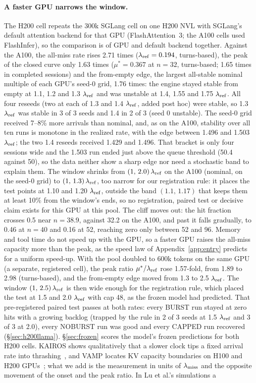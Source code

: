 \paragraph{A faster GPU narrows the window.}\label{sec:h200}
The H200 cell repeats the 300k SGLang cell on one H200 NVL with SGLang's default attention backend for that GPU (FlashAttention~3; the A100 cells used FlashInfer), so the comparison is of GPU and default backend together. Against the A100, the all-miss rate rises 2.71 times ($\lambda_{\mathrm{ref}}=0.194$\sps, turns-based), the peak of the closed curve only 1.63 times ($\mu^*=0.367$\sps{} at $n=32$, turns-based; 1.65 times in completed sessions) and the from-empty edge, the largest all-stable nominal multiple of each GPU's seed-0 grid, 1.76 times: the engine stayed stable from empty at 1.1, 1.2 and 1.3 $\lambda_{\mathrm{ref}}$ and was unstable at 1.4, 1.55 and 1.75 $\lambda_{\mathrm{ref}}$. All four reseeds (two at each of 1.3 and 1.4 $\lambda_{\mathrm{ref}}$, added post hoc) were stable, so 1.3 $\lambda_{\mathrm{ref}}$ was stable in 3 of 3 seeds and 1.4 in 2 of 3 (seed 0 unstable). The seed-0 grid received 7--8\% more arrivals than nominal, and, as on the A100, stability over all ten runs is monotone in the realized rate, with the edge between 1.496 and 1.503 $\lambda_{\mathrm{ref}}$; the two 1.4 reseeds received 1.429 and 1.496. That bracket is only four sessions wide and the 1.503 run ended just above the queue threshold (50.4 against 50), so the data neither show a sharp edge nor need a stochastic band to explain them. The window shrinks from $(1,\,2.0)\,\lambda_{\mathrm{ref}}$ on the A100 (nominal, on the seed-0 grid) to $(1,\,1.3)\,\lambda_{\mathrm{ref}}$, too narrow for our registration rule: it places the test points at 1.10 and 1.20 $\lambda_{\mathrm{ref}}$, outside the band $(1.1,\,1.17)$ that keeps them at least 10\% from the window's ends, so no registration, paired test or decisive claim exists for this GPU at this pool. The cliff moves out: the hit fraction crosses 0.5 near $n=38.9$, against 32.2 on the A100, and past it falls gradually, to 0.46 at $n=40$ and 0.16 at 52, reaching zero only between 52 and 96. Memory and tool time do not speed up with the GPU, so a faster GPU raises the all-miss capacity more than the peak, as the speed law of Appendix~\ref{app:entry} predicts for a uniform speed-up. With the pool doubled to 600k tokens on the same GPU (a separate, registered cell), the peak ratio $\mu^*/\lambda_{\mathrm{ref}}$ rose 1.57-fold, from 1.89 to 2.98 (turns-based), and the from-empty edge moved from 1.3 to 2.5 $\lambda_{\mathrm{ref}}$. The window $(1,\,2.5)\,\lambda_{\mathrm{ref}}$ is then wide enough for the registration rule, which placed the test at 1.5 and 2.0 $\lambda_{\mathrm{ref}}$ with cap 48, as the frozen model had predicted. That pre-registered paired test passes at both rates: every BURST run stayed at zero hits with a growing backlog (trapped by the rule in 2 of 3 seeds at 1.5 $\lambda_{\mathrm{ref}}$ and 3 of 3 at 2.0), every NOBURST run was good and every CAPPED run recovered (\S\ref{sec:h200llama}). \S\ref{sec:frozen} scores the model's frozen predictions for both H200 cells. KAIROS shows qualitatively that a slower clock tips a fixed arrival rate into thrashing~\citep{yuan2026kairos}, and VAMP locates KV capacity boundaries on H100 and H200 GPUs~\citep{kim2026vamp}; what we add is the measurement in units of $\lambda_{\mathrm{miss}}$ and the opposite movement of the onset and the peak ratio. In Lu et al.'s simulations a 